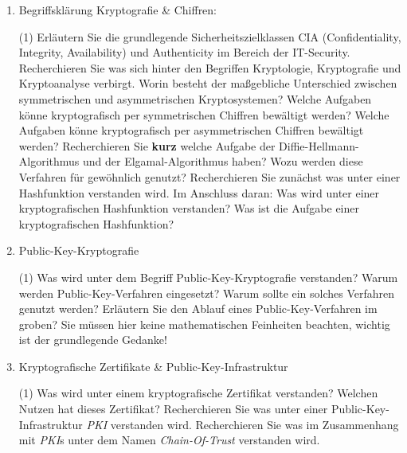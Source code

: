 \documentclass[paper=a4,fontsize=11pt]{scrartcl}%
\begin{document}
\begin{enumerate}
	\item Begriffsklärung Kryptografie \& Chiffren:
	\begin{tasks}(1)
	\task Erläutern Sie die grundlegende Sicherheitszielklassen CIA (Confidentiality, Integrity, Availability) und Authenticity im Bereich der IT-Security.
	\task Recherchieren Sie was sich hinter den Begriffen Kryptologie, Kryptografie und Kryptoanalyse verbirgt.
	\task Worin besteht der maßgebliche Unterschied zwischen symmetrischen und asymmetrischen Kryptosystemen?
	\task Welche Aufgaben könne kryptografisch per symmetrischen Chiffren bewältigt werden?
	\task Welche Aufgaben könne kryptografisch per asymmetrischen Chiffren bewältigt werden?
	\task Recherchieren Sie \textbf{kurz} welche Aufgabe der Diffie-Hellmann-Algorithmus und der Elgamal-Algorithmus haben? Wozu werden diese Verfahren für gewöhnlich genutzt?
	\task Recherchieren Sie zunächst was unter einer Hashfunktion verstanden wird. Im Anschluss daran: Was wird unter einer kryptografischen Hashfunktion verstanden?
	\task Was ist die Aufgabe einer kryptografischen Hashfunktion?
	\end{tasks}
	\item Public-Key-Kryptografie
	\begin{tasks}(1)
		\task Was wird unter dem Begriff Public-Key-Kryptografie verstanden?
		\task Warum werden Public-Key-Verfahren eingesetzt? Warum sollte ein solches Verfahren genutzt werden?
		\task Erläutern Sie den Ablauf eines Public-Key-Verfahren im groben? Sie müssen hier keine mathematischen Feinheiten beachten, wichtig ist der grundlegende Gedanke!
	\end{tasks}
	\item Kryptografische Zertifikate \& Public-Key-Infrastruktur
	\begin{tasks}(1)
		\task Was wird unter einem kryptografische Zertifikat verstanden? Welchen Nutzen hat dieses Zertifikat?
		\task Recherchieren Sie was unter einer Public-Key-Infrastruktur \emph{PKI} verstanden wird.
		\task Recherchieren Sie was im Zusammenhang mit \emph{PKI}s unter dem Namen \emph{Chain-Of-Trust} verstanden wird.
	\end{tasks}
\end{enumerate}
\end{document}

